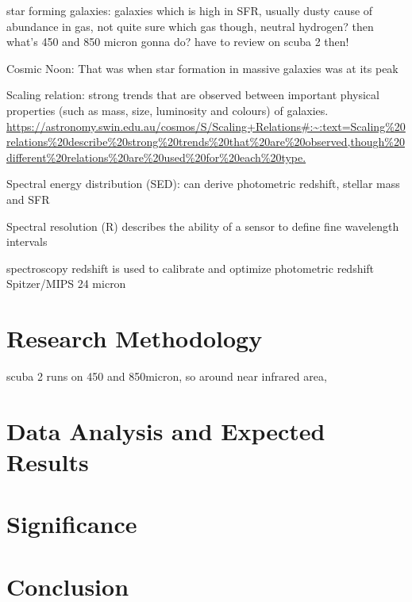 \documentclass{article}
\begin{document}
star forming galaxies:
galaxies which is high in SFR, usually dusty cause of abundance in gas, not quite sure which gas though, neutral hydrogen?
then what's 450 and 850 micron gonna do? have to review on scuba 2 then!

Cosmic Noon:
That was when star formation in massive galaxies was at its peak

Scaling relation:
strong trends that are observed between important physical properties (such as mass, size, luminosity and colours) of galaxies. 
\url{https://astronomy.swin.edu.au/cosmos/S/Scaling+Relations#:~:text=Scaling%20relations%20describe%20strong%20trends%20that%20are%20observed,though%20different%20relations%20are%20used%20for%20each%20type.}

Spectral energy distribution (SED):
can derive photometric redshift, stellar mass and SFR

Spectral resolution (R) describes the ability of a sensor to define fine wavelength intervals

spectroscopy redshift is used to calibrate and optimize photometric redshift
Spitzer/MIPS 24 micron

\section{Research Methodology}
scuba 2 runs on 450 and 850micron, so around near infrared area, 
\section{Data Analysis and Expected Results}
\section{Significance}
\section{Conclusion}



\end{document}
